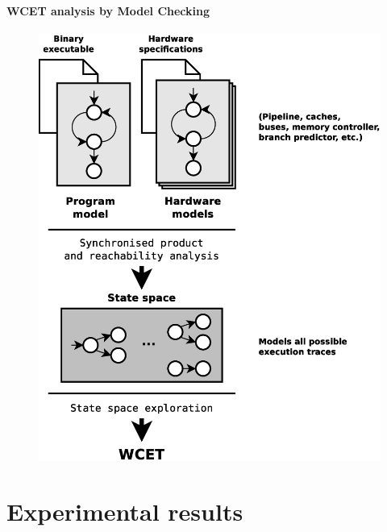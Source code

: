 \documentclass[usenames,dvipsnames]{beamer}
\begin{document}
  \begin{frame}
    \frametitle{\secname}
    \framesubtitle{WCET analysis by Model Checking}
    \small

    \begin{figure}
      \centering
      \includegraphics[height=.8\textheight]{fig/model-checking}
    \end{figure}
  \end{frame}

  
  \section{Experimental results}
  \begin{frame}
    \tableofcontents[currentsection]
  \end{frame}
  
\end{document}
